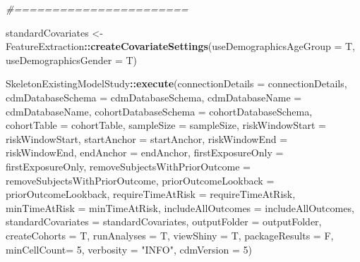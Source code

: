 \documentclass[
]{article}
\newenvironment{Shaded}{\begin{snugshade}}{\end{snugshade}}
\newcommand{\CommentTok}[1]{\textcolor[rgb]{0.56,0.35,0.01}{\textit{#1}}}
\newcommand{\DataTypeTok}[1]{\textcolor[rgb]{0.13,0.29,0.53}{#1}}
\newcommand{\DecValTok}[1]{\textcolor[rgb]{0.00,0.00,0.81}{#1}}
\newcommand{\KeywordTok}[1]{\textcolor[rgb]{0.13,0.29,0.53}{\textbf{#1}}}
\newcommand{\NormalTok}[1]{#1}
\newcommand{\OperatorTok}[1]{\textcolor[rgb]{0.81,0.36,0.00}{\textbf{#1}}}
\newcommand{\StringTok}[1]{\textcolor[rgb]{0.31,0.60,0.02}{#1}}
\begin{document}
\begin{Shaded}
\begin{Highlighting}[]
\CommentTok{#=======================}

\NormalTok{standardCovariates <-}\StringTok{ }\NormalTok{FeatureExtraction}\OperatorTok{::}\KeywordTok{createCovariateSettings}\NormalTok{(}\DataTypeTok{useDemographicsAgeGroup =}\NormalTok{ T, }\DataTypeTok{useDemographicsGender =}\NormalTok{ T)}

\NormalTok{SkeletonExistingModelStudy}\OperatorTok{::}\KeywordTok{execute}\NormalTok{(}\DataTypeTok{connectionDetails =}\NormalTok{ connectionDetails,}
                                    \DataTypeTok{cdmDatabaseSchema =}\NormalTok{ cdmDatabaseSchema,}
                                    \DataTypeTok{cdmDatabaseName =}\NormalTok{ cdmDatabaseName,}
                                    \DataTypeTok{cohortDatabaseSchema =}\NormalTok{ cohortDatabaseSchema,}
                                    \DataTypeTok{cohortTable =}\NormalTok{ cohortTable,}
                                    \DataTypeTok{sampleSize =}\NormalTok{ sampleSize,}
                                    \DataTypeTok{riskWindowStart =}\NormalTok{ riskWindowStart,}
                                    \DataTypeTok{startAnchor =}\NormalTok{ startAnchor,}
                                    \DataTypeTok{riskWindowEnd =}\NormalTok{ riskWindowEnd,}
                                    \DataTypeTok{endAnchor =}\NormalTok{ endAnchor,}
                                    \DataTypeTok{firstExposureOnly =}\NormalTok{ firstExposureOnly,}
                                    \DataTypeTok{removeSubjectsWithPriorOutcome =}\NormalTok{ removeSubjectsWithPriorOutcome,}
                                    \DataTypeTok{priorOutcomeLookback =}\NormalTok{ priorOutcomeLookback,}
                                    \DataTypeTok{requireTimeAtRisk =}\NormalTok{ requireTimeAtRisk,}
                                    \DataTypeTok{minTimeAtRisk =}\NormalTok{ minTimeAtRisk,}
                                    \DataTypeTok{includeAllOutcomes =}\NormalTok{ includeAllOutcomes,}
                                    \DataTypeTok{standardCovariates =}\NormalTok{ standardCovariates,}
                                    \DataTypeTok{outputFolder =}\NormalTok{ outputFolder,}
                                    \DataTypeTok{createCohorts =}\NormalTok{ T,}
                                    \DataTypeTok{runAnalyses =}\NormalTok{ T,}
                                    \DataTypeTok{viewShiny =}\NormalTok{ T,}
                                    \DataTypeTok{packageResults =}\NormalTok{ F,}
                                    \DataTypeTok{minCellCount=} \DecValTok{5}\NormalTok{,}
                                    \DataTypeTok{verbosity =} \StringTok{"INFO"}\NormalTok{,}
                                    \DataTypeTok{cdmVersion =} \DecValTok{5}\NormalTok{)}
\end{Highlighting}
\end{Shaded}
\end{document}
